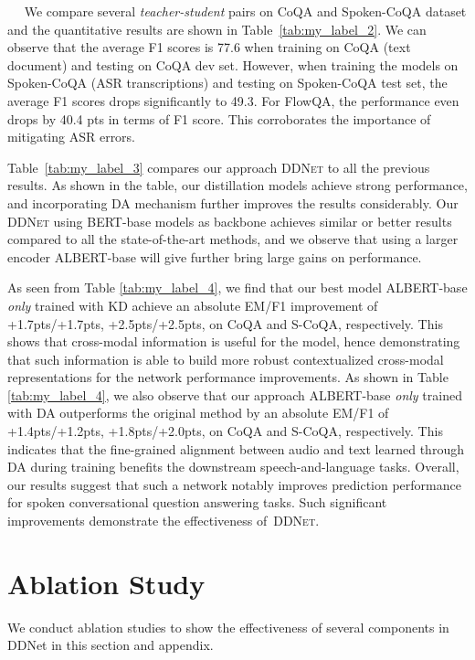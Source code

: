 \documentclass[11pt]{article}
\newcommand{\myparagraph}[1]{\vspace{2pt}\noindent{\bf{#1}}~~}
\begin{document}
\myparagraph{Results.}
We compare several \textit{teacher-student} pairs on CoQA and Spoken-CoQA dataset and the quantitative results are shown in Table~\ref{tab:my_label_2}. We can observe that the average F1 scores is 77.6 when training on CoQA (text document) and testing on CoQA dev set. However, when training the models on Spoken-CoQA (ASR transcriptions) and testing on Spoken-CoQA test set, the average F1 scores drops significantly to 49.3. For FlowQA, the performance even drops by 40.4 pts in terms of F1 score. This corroborates the importance of mitigating ASR errors.

Table~\ref{tab:my_label_3} compares our approach \textsc{DDNet} to all the previous results. As shown in the table, our distillation models achieve strong performance, and incorporating DA mechanism further improves the results considerably. Our \textsc{DDNet} using BERT-base models as backbone achieves similar or better results compared to all the state-of-the-art methods, and we observe that using a larger encoder ALBERT-base will give further bring large gains on performance.


As seen from Table \ref{tab:my_label_4}, we find that our best model ALBERT-base \textit{only} trained with KD achieve an absolute EM/F1 improvement of +1.7pts/+1.7pts, +2.5pts/+2.5pts, on CoQA and S-CoQA, respectively.
 This shows that cross-modal information is useful for the model, hence demonstrating that such information is able to build more robust contextualized cross-modal representations for the network performance improvements.
As shown in Table \ref{tab:my_label_4}, we also observe that our approach ALBERT-base \textit{only} trained with DA outperforms the original method by an absolute EM/F1 of +1.4pts/+1.2pts, +1.8pts/+2.0pts, on CoQA and S-CoQA, respectively.
This indicates that the fine-grained alignment between audio and text learned through DA during training benefits the downstream speech-and-language tasks.
Overall, our results suggest that such a network notably improves prediction performance for spoken conversational question answering tasks. Such significant improvements demonstrate the effectiveness of~\textsc{DDNet}.
 
\section{Ablation Study}
We conduct ablation studies to show the effectiveness of several components
in DDNet in this section and appendix.
\end{document}
